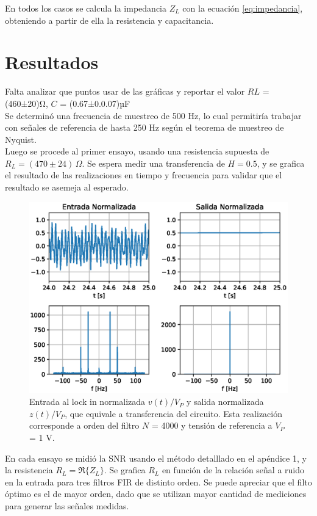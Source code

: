\documentclass[11pt,a4paper]{extarticle}
\begin{document}
\begin{multicols}{2}
En todos los casos se calcula la impedancia $Z_L$ con la ecuación \ref{eq:impedancia}, obteniendo a partir de ella la resistencia y capacitancia.

\section{Resultados}

Falta analizar que puntos usar de las gráficas y reportar
el valor $RL$ = (460±20)Ω, $C$ = (0.67±0.0.07)µF\\

Se determinó una frecuencia de muestreo de 500 Hz, lo cual permitiría trabajar con señales de referencia de hasta 250 Hz 
según el teorema de muestreo de Nyquist.\\

Luego se procede al primer ensayo, usando una resistencia supuesta de $R_L = (470 \pm 24)\,\Omega$.
Se espera medir una transferencia de $H = 0.5$, y se grafica el resultado de las realizaciones en tiempo y frecuencia para validar que el resultado se asemeja al esperado.\\

\begin{figure}[H]
	\centering
	\includegraphics[width=\linewidth]{Images/in_out.eps}
	\caption{Entrada al lock in normalizada $v(t)/V_P$ y salida normalizada $z(t)/V_P$, 
	que equivale a transferencia del circuito. Esta realización corresponde a orden del filtro $N$ = 4000 y tensión de referencia a $V_P$ = 1 V.}
	\label{fig:in_out}
\end{figure}

En cada ensayo se midió la SNR usando el método detalllado en el apéndice 1, y la resistencia $R_L = \Re\{Z_L\}$.
Se grafica $R_L$ en función de la relación señal a ruido en la entrada para tres 
filtros FIR de distinto orden.
Se puede apreciar que el filto óptimo es el de mayor 
orden, dado que se utilizan mayor cantidad de 
mediciones para generar las señales medidas.


\end{multicols}
\end{document}
